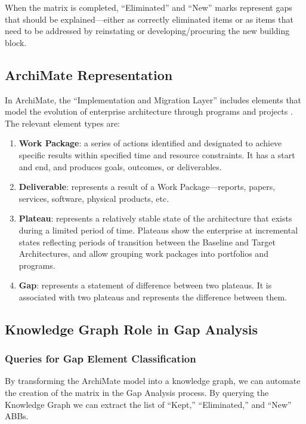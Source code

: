 When the matrix is completed, ``Eliminated'' and ``New'' marks represent gaps that should be explained---either as correctly eliminated items or as items that need to be addressed by reinstating or developing/procuring the new building block.

\subsection{ArchiMate Representation}
\label{subsec:archimate-gap}

In ArchiMate, the ``Implementation and Migration Layer'' includes elements that model the evolution of enterprise architecture through programs and projects \parencite{opengroup2023archimate}. The relevant element types are:

\begin{enumerate}
    \item \textbf{Work Package}: a series of actions identified and designated to achieve specific results within specified time and resource constraints. It has a start and end, and produces goals, outcomes, or deliverables.
    \item \textbf{Deliverable}: represents a result of a Work Package---reports, papers, services, software, physical products, etc.
    \item \textbf{Plateau}: represents a relatively stable state of the architecture that exists during a limited period of time. Plateaus show the enterprise at incremental states reflecting periods of transition between the Baseline and Target Architectures, and allow grouping work packages into portfolios and programs.
    \item \textbf{Gap}: represents a statement of difference between two plateaus. It is associated with two plateaus and represents the difference between them.
\end{enumerate}

\subsection{Knowledge Graph Role in Gap Analysis}
\label{subsec:kg-gap}

\subsubsection{Queries for Gap Element Classification}
\label{subsubsec:kg-gap-queries}
By transforming the ArchiMate model into a knowledge graph, we can automate the creation of the matrix in the Gap Analysis process. By querying the Knowledge Graph we can extract the list of ``Kept,'' ``Eliminated,'' and ``New'' ABBs.

